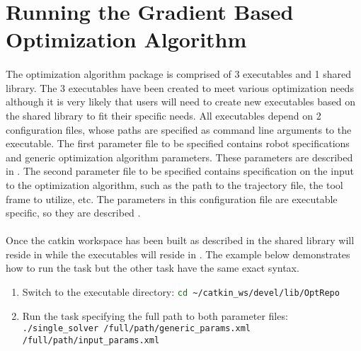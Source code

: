 \documentclass[letterpaper]{article}
\begin{document}
\section{Running the Gradient Based Optimization Algorithm}
\paragraph{}The optimization algorithm package is comprised of 3 executables and 1 shared library. The 3 executables have been created to meet various optimization needs although it is very likely that users will need to create new executables based on the shared library to fit their specific needs. All executables depend on 2 configuration files, whose paths are specified as command line arguments to the executable. The first parameter file to be specified contains robot specifications and generic optimization algorithm parameters. These parameters are described in . The second parameter file to be specified contains specification on the input to the optimization algorithm, such as the path to the trajectory file, the tool frame to utilize, etc. The parameters in this configuration file are executable specific, so they are described .

\paragraph{}Once the catkin workspace has been built as described in  the shared library will reside in  while the executables will reside in . The example below demonstrates how to run the  task but the other task have the same exact syntax.

\begin{enumerate}
	\item Switch to the executable directory: \lstinline[language=bash]!cd ~/catkin_ws/devel/lib/OptRepo!
	\item Run the task specifying the full path to both parameter files: \newline \lstinline[language=bash]!./single_solver /full/path/generic_params.xml /full/path/input_params.xml!
\end{enumerate}
\end{document}
